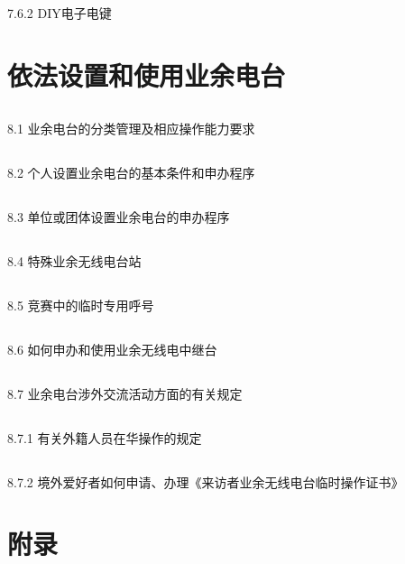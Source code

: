 \documentclass[12pt,UTF8]{ctexbook}
\begin{document}
\section{}7.6.2 DIY电子电键

\chapter{依法设置和使用业余电台}

\section{}8.1 业余电台的分类管理及相应操作能力要求
\section{}8.2 个人设置业余电台的基本条件和申办程序
\section{}8.3 单位或团体设置业余电台的申办程序
\section{}8.4 特殊业余无线电台站
\section{}8.5 竞赛中的临时专用呼号
\section{}8.6 如何申办和使用业余无线电中继台
\section{}8.7 业余电台涉外交流活动方面的有关规定
\section{}8.7.1 有关外籍人员在华操作的规定
\section{}8.7.2 境外爱好者如何申请、办理《来访者业余无线电台临时操作证书》

\backmatter

\chapter{附录}
\end{document}
